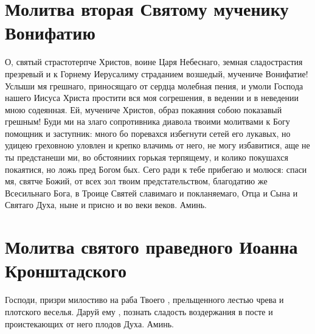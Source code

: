 \section{Молитва вторая Святому мученику Вонифатию}\begin{mymulticols}

О, святый страстотерпче Христов, воине Царя Небеснаго, земная сладострастия презревый и к Горнему Иерусалиму страданием возшедый, мучениче Вонифатие! Услыши мя грешнаго, приносящаго от сердца молебная пения, и умоли Господа нашего Иисуса Христа простити вся моя согрешения, в ведении и в неведении мною содеянная. Ей, мучениче Христов, образ покаяния собою показавый грешным! Буди ми на злаго сопротивника диавола твоими молитвами к Богу помощник и заступник: много бо поревахся избегнути сетей его лукавых, но удицею греховною уловлен и крепко влачимь от него, не могу избавитися, аще не ты предстанеши ми, во обстояниих горькая терпящему, и колико покушахся покаятися, но ложь пред Богом бых. Сего ради к тебе прибегаю и молюся: спаси мя, святче Божий, от всех зол твоим предстательством, благодатию же Всесильнаго Бога, в Троице Святей славимаго и покланяемаго, Отца и Сына и Святаго Духа, ныне и присно и во веки веков. Аминь. 

\end{mymulticols}

\section{Молитва святого праведного Иоанна Кронштадского}\begin{mymulticols}

Господи, призри милостиво на раба Твоего , прельщенного лестью чрева и плотского веселья. Даруй ему , познать сладость воздержания в посте и проистекающих от него плодов Духа. Аминь.


\end{mymulticols}

